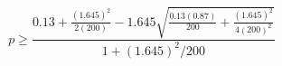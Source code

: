 

\[
p \ge \frac{0.13 + \frac{(1.645)^{2}}{2(200)} - 1.645\sqrt{\frac{0.13(0.87)}{200} + \frac{(1.645)^{2}}{4(200)^2}}} {1 + (1.645)^{2}/200}
\]


